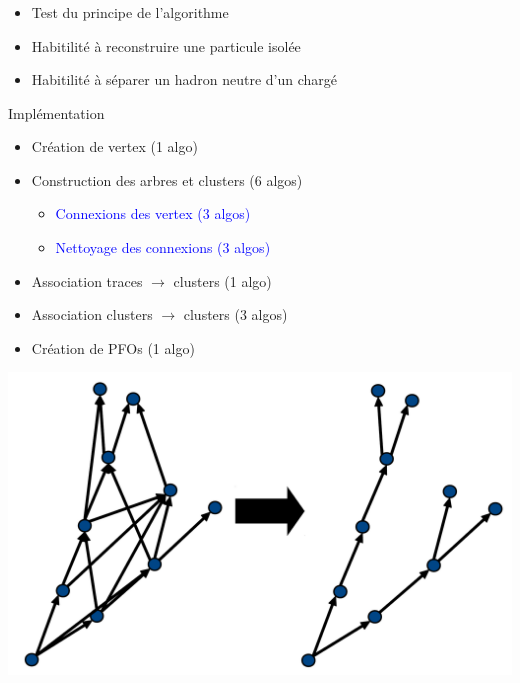 \documentclass[8pt]{beamer}
\begin{document}
  \begin{frame}
  \frametitle{\secname}
  \framesubtitle{\subsecname}

    \begin{itemize}
      \item Test du principe de l'algorithme
      \item Habitilité à reconstruire une particule isolée
      \item Habitilité à séparer un hadron neutre d'un chargé
    \end{itemize}

    \begin{block}{Implémentation}
      \begin{minipage}{0.6\linewidth}
        \begin{itemize}
          \item Création de vertex (1 algo)
          \item Construction des arbres et clusters (6 algos)
          \begin{itemize}
            \item \textcolor<2->{blue}{Connexions des vertex (3 algos)}
            \item \textcolor<2->{blue}{Nettoyage des connexions (3 algos)}
          \end{itemize}
          \item Association traces $\rightarrow$ clusters (1 algo)
          \item Association clusters $\rightarrow$ clusters (3 algos)
          \item Création de PFOs (1 algo)
        \end{itemize}
      \end{minipage}
      \begin{minipage}{0.39\linewidth}
        \begin{center}
          { \includegraphics[width=\linewidth]{ConnectCleanIntro.pdf}}
        \end{center}
      \end{minipage}
    \end{block}

  \end{frame}
\end{document}
